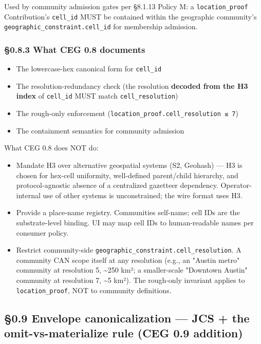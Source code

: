 \documentclass[11pt]{article}
\begin{document}
Used by community admission gates per §8.1.13 Policy M: a \texttt{location\_proof} Contribution's \texttt{cell\_id} MUST be contained within the geographic community's \texttt{geographic\_constraint.cell\_id} for membership admission.


\subsubsection*{§0.8.3 What CEG 0.8 documents}


\begin{itemize}\setlength\itemsep{0pt}
\item The lowercase-hex canonical form for \texttt{cell\_id}
\item The resolution-redundancy check (the resolution \textbf{decoded from the H3 index} of \texttt{cell\_id} MUST match \texttt{cell\_resolution})
\item The rough-only enforcement (\texttt{location\_proof.cell\_resolution ≤ 7})
\item The containment semantics for community admission
\end{itemize}


What CEG 0.8 does NOT do:

\begin{itemize}\setlength\itemsep{0pt}
\item Mandate H3 over alternative geospatial systems (S2, Geohash) — H3 is chosen for hex-cell uniformity, well-defined parent/child hierarchy, and protocol-agnostic absence of a centralized gazetteer dependency. Operator-internal use of other systems is unconstrained; the wire format uses H3.
\item Provide a place-name registry. Communities self-name; cell IDs are the substrate-level binding. UI may map cell IDs to human-readable names per consumer policy.
\item Restrict community-side \texttt{geographic\_constraint.cell\_resolution}. A community CAN scope itself at any resolution (e.g., an "Austin metro" community at resolution 5, \textasciitilde{}250 km²; a smaller-scale "Downtown Austin" community at resolution 7, \textasciitilde{}5 km²). The rough-only invariant applies to \texttt{location\_proof}, NOT to community definitions.
\end{itemize}



\subsection*{§0.9 Envelope canonicalization — JCS + the omit-vs-materialize rule (CEG 0.9 addition)}
\end{document}
